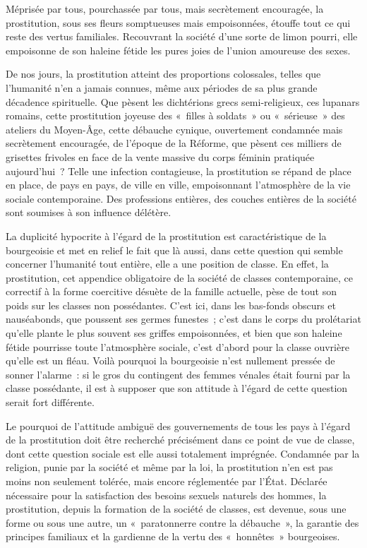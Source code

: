 \documentclass[french,twoside]{book} %
\begin{document}
\noindent Méprisée par tous, pourchassée par tous, mais secrètement encouragée, la prostitution, sous ses fleurs somptueuses mais empoisonnées, étouffe tout ce qui reste des vertus familiales. Recouvrant la société d’une sorte de limon pourri, elle empoisonne de son haleine fétide les pures joies de l’union amoureuse des sexes.\par
De nos jours, la prostitution atteint des proportions colossales, telles que l’humanité n’en a jamais connues, même aux périodes de sa plus grande décadence spirituelle. Que pèsent les dichtérions grecs semi-religieux, ces lupanars romains, cette prostitution joyeuse des « filles à soldats » ou « sérieuse » des ateliers du Moyen-Âge, cette débauche cynique, ouvertement condamnée mais secrètement encouragée, de l’époque de la Réforme, que pèsent ces milliers de grisettes frivoles en face de la vente massive du corps féminin pratiquée aujourd’hui ? Telle une infection contagieuse, la prostitution se répand de place en place, de pays en pays, de ville en ville, empoisonnant l’atmosphère de la vie sociale contemporaine. Des professions entières, des couches entières de la société sont soumises à son influence délétère.\par
La duplicité hypocrite à l’égard de la prostitution est caractéristique de la bourgeoisie et met en relief le fait que là aussi, dans cette question qui semble concerner l’humanité tout entière, elle a une position de classe. En effet, la prostitution, cet appendice obligatoire de la société de classes contemporaine, ce correctif à la forme coercitive désuète de la famille actuelle, pèse de tout son poids sur les classes non possédantes. C’est ici, dans les bas-fonds obscurs et nauséabonds, que poussent ses germes funestes ; c’est dans le corps du prolétariat qu’elle plante le plus souvent ses griffes empoisonnées, et bien que son haleine fétide pourrisse toute l’atmosphère sociale, c’est d’abord pour la classe ouvrière qu’elle est un fléau. Voilà pourquoi la bourgeoisie n’est nullement pressée de sonner l’alarme : si le gros du contingent des femmes vénales était fourni par la classe possédante, il est à supposer que son attitude à l’égard de cette question serait fort différente.\par
Le pourquoi de l’attitude ambiguë des gouvernements de tous les pays à l’égard de la prostitution doit être recherché précisément dans ce point de vue de classe, dont cette question sociale est elle aussi totalement imprégnée. Condamnée par la religion, punie par la société et même par la loi, la prostitution n’en est pas moins non seulement tolérée, mais encore réglementée par l’État. Déclarée nécessaire pour la satisfaction des besoins sexuels naturels des hommes, la prostitution, depuis la formation de la société de classes, est devenue, sous une forme ou sous une autre, un « paratonnerre contre la débauche », la garantie des principes familiaux et la gardienne de la vertu des « honnêtes » bourgeoises.\par
\end{document}
